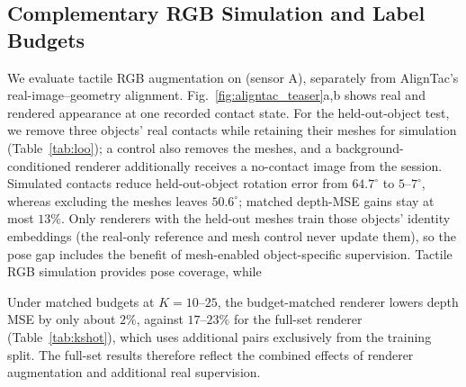 \subsection{Complementary RGB Simulation and Label Budgets}
\label{sec:study}
We evaluate tactile RGB augmentation on \sensor{} (sensor A), separately from AlignTac's real-image--geometry alignment. Fig.~\ref{fig:aligntac_teaser}a,b shows real and rendered appearance at one recorded contact state. For the held-out-object test, we remove three objects' real contacts while retaining their meshes for simulation (Table~\ref{tab:loo}); a control also removes the meshes, and a background-conditioned renderer additionally receives a no-contact image from the session. Simulated contacts reduce held-out-object rotation error from $64.7^\circ$ to $5$--$7^\circ$, whereas excluding the meshes leaves $50.6^\circ$; matched depth-MSE gains stay at most $13\%$. Only renderers with the held-out meshes train those objects' identity embeddings (the real-only reference and mesh control never update them), so the pose gap includes the benefit of mesh-enabled object-specific supervision. Tactile RGB simulation provides pose coverage, while 

Under matched budgets at $K=10$--$25$, the budget-matched renderer lowers depth MSE by only about $2\%$, against $17$--$23\%$ for the full-set renderer (Table~\ref{tab:kshot}), which uses additional pairs exclusively from the training split. The full-set results therefore reflect the combined effects of renderer augmentation and additional real supervision.
